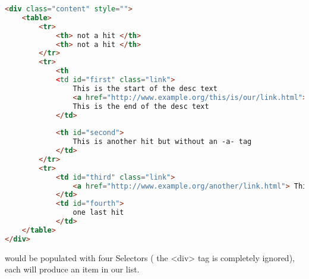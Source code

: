 \begin{lstlisting}[language=HTML]
<div class="content" style="">
	<table>
		<tr>
			<th> not a hit </th>
			<th> not a hit </th>
		</tr>
		<tr>
			<th
			<td id="first" class="link">
				This is the start of the desc text
				<a href="http://www.example.org/this/is/our/link.html"> This is our link text</a>
				This is the end of the desc text
			</td>
		
			<th id="second">
				This is another hit but without an -a- tag
			</td>
		</tr>
		<tr>
			<td id="third" class="link">
				<a href="http://www.example.org/another/link.html"> This is our link text</a>
			</td>
			<td id="fourth">
				one last hit
			</td>
	</table>
</div>
\end{lstlisting}
 would be populated with four Selectors ( the <div> tag is completely ignored), each will produce an item in our  list. 
